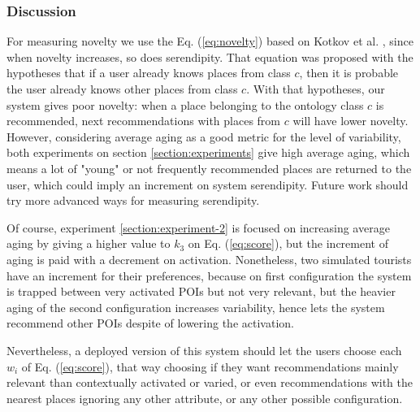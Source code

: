 \subsubsection{Discussion}

For measuring novelty we use the Eq. (\ref{eq:novelty}) based on Kotkov et al. \cite{kotkov2016survey}, since when novelty increases, so does serendipity. That equation was proposed with the hypotheses that if a user already knows places from class $c$, then it is probable the user already knows other places from class $c$. With that hypotheses, our system gives poor novelty: when a place belonging to the ontology class $c$ is recommended, next recommendations with places from $c$ will have lower novelty. However, considering average aging as a good metric for the level of variability, both experiments on section \ref{section:experiments} give high average aging, which means a lot of "young" or not frequently recommended places are returned to the user, which could imply an increment on system serendipity. Future work should try more advanced ways for measuring serendipity.

Of course, experiment \ref{section:experiment-2} is focused on increasing average aging by giving a higher value to $k_3$ on Eq. (\ref{eq:score}), but the increment of aging is paid with a decrement on activation. Nonetheless, two simulated tourists have an increment for their preferences, because on first configuration the system is trapped between very activated POIs but not very relevant, but the heavier aging of the second configuration increases variability, hence lets the system recommend other POIs despite of lowering the activation. 

Nevertheless, a deployed version of this system should let the users choose each $w_i$ of Eq. (\ref{eq:score}), that way choosing if they want recommendations mainly relevant than contextually activated or varied, or even recommendations with the nearest places ignoring any other attribute, or any other possible configuration.
